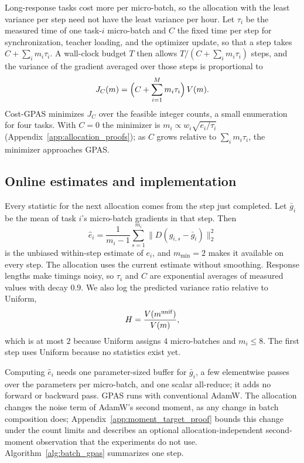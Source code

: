 Long-response tasks cost more per micro-batch, so the allocation with the
least variance per step need not have the least variance per hour. Let
$\tau_i$ be the measured time of one task-$i$ micro-batch and $C$ the fixed
time per step for synchronization, teacher loading, and the optimizer update,
so that a step takes $C+\sum_i m_i\tau_i$. A wall-clock budget $T$ then allows
$T/(C+\sum_i m_i\tau_i)$ steps, and the variance of the gradient averaged
over those steps is proportional to
\begin{equation}
    J_C(m)=\Bigl(C+\sum_{i=1}^M m_i\tau_i\Bigr)\,V(m).
    \label{eq:batch_cost_objective}
\end{equation}
Cost-GPAS minimizes $J_C$ over the feasible integer counts, a small
enumeration for four tasks. With $C=0$ the minimizer is
$m_i\propto w_i\sqrt{e_i/\tau_i}$ (Appendix~\ref{app:allocation_proofs}); as
$C$ grows relative to $\sum_i m_i\tau_i$, the minimizer approaches GPAS.

\subsection{Online estimates and implementation}

Every statistic for the next allocation comes from the step just completed.
Let $\bar g_i$ be the mean of task $i$'s micro-batch gradients in that step.
Then
\begin{equation}
    \widehat e_i=\frac{1}{m_i-1}\sum_{s=1}^{m_i}
    \bigl\|D(g_{i,s}-\bar g_i)\bigr\|_2^2
    \label{eq:noise_estimate}
\end{equation}
is the unbiased within-step estimate of $e_i$, and $m_{\min}=2$ makes it
available on every step. The allocation uses the current estimate without
smoothing.  Response lengths
make timings noisy, so $\tau_i$ and $C$ are exponential averages of measured
values with decay $0.9$. We also log the predicted variance ratio relative to
Uniform,
\begin{equation}
    H=\frac{V(m^{\rm unif})}{V(m)},
    \label{eq:allocation_variance_ratio}
\end{equation}
which is at most $2$ because Uniform assigns $4$ micro-batches and
$m_i\leq8$. The first step uses Uniform because no statistics exist yet.

Computing $\widehat e_i$ needs one parameter-sized buffer for $\bar g_i$, a
few elementwise passes over the parameters per micro-batch, and one scalar
all-reduce; it adds no forward or backward pass. GPAS runs with conventional
AdamW. The allocation changes the noise term of AdamW's second moment, as any
change in batch composition does; Appendix~\ref{app:moment_target_proof}
bounds this change under the count limits and describes an optional
allocation-independent second-moment observation that the experiments do not
use. Algorithm~\ref{alg:batch_gpas} summarizes one step.

